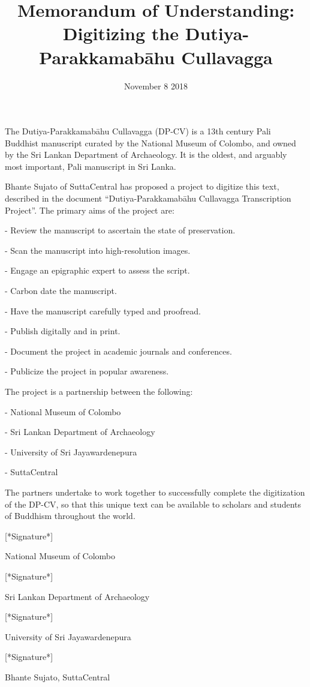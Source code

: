 \documentclass[11pt, openany,a4paper]{article}
\title{Memorandum of Understanding: Digitizing the Dutiya-Parakkamabāhu Cullavagga}
\author{}
\date{November 8 2018}
\begin{document}
\maketitle

\thispagestyle{empty}
\begin{markdown}


The Dutiya-Parakkamabāhu Cullavagga (DP-CV) is a 13th century Pali Buddhist manuscript curated by the National Museum of Colombo, and owned by the Sri Lankan Department of Archaeology. It is the oldest, and arguably most important, Pali manuscript in Sri Lanka.

Bhante Sujato of SuttaCentral has proposed a project to digitize this text, described in the document “Dutiya-Parakkamabāhu Cullavagga Transcription Project”. The primary aims of the project are:

- Review the manuscript to ascertain the state of preservation.

- Scan the manuscript into high-resolution images.

- Engage an epigraphic expert to assess the script.

- Carbon date the manuscript.

- Have the manuscript carefully typed and proofread.

- Publish digitally and in print.

- Document the project in academic journals and conferences.

- Publicize the project in popular awareness.

The project is a partnership between the following:

- National Museum of Colombo

- Sri Lankan Department of Archaeology

- University of Sri Jayawardenepura

- SuttaCentral

The partners undertake to work together to successfully complete the digitization of the DP-CV, so that this unique text can be available to scholars and students of Buddhism throughout the world.

\end{markdown}

\begin{multicols}{2}
\begin{center}
[*Signature*]

National Museum of Colombo

\bigskip

[*Signature*]

Sri Lankan Department of Archaeology



[*Signature*]

University of Sri Jayawardenepura

\bigskip

[*Signature*]

Bhante Sujato, SuttaCentral


\end{center}
\end{multicols}
\end{document}
